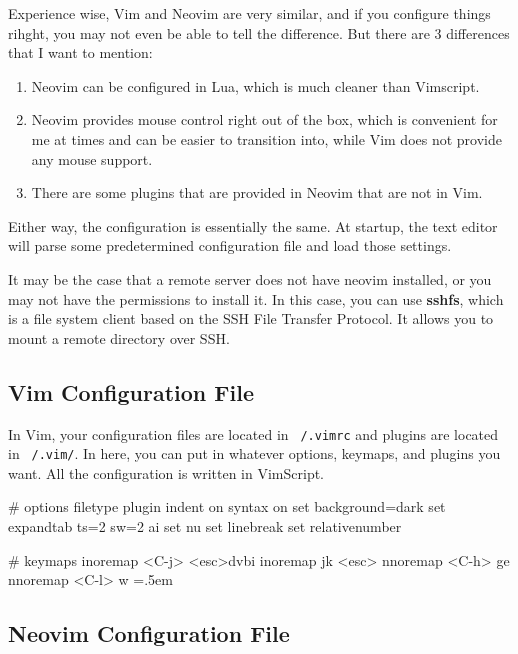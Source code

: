 \documentclass{article}
\newenvironment{cverbatim}
    {\SaveVerbatim{cverb}}
    {\endSaveVerbatim
    \flushleft\fboxrule=0pt\fboxsep=.5em
    \colorbox{cverbbg}{%
      \makebox[\dimexpr\linewidth-2\fboxsep][l]{\BUseVerbatim{cverb}}%
    }
    \endflushleft
  }
\begin{document}
    Experience wise, Vim and Neovim are very similar, and if you configure things rihght, you may not even be able to tell the difference. But there are 3 differences that I want to mention: 
    
    \begin{enumerate}
      \item Neovim can be configured in Lua, which is much cleaner than Vimscript. 
      \item Neovim provides mouse control right out of the box, which is convenient for me at times and can be easier to transition into, while Vim does not provide any mouse support. 
      \item There are some plugins that are provided in Neovim that are not in Vim. 
    \end{enumerate}

    Either way, the configuration is essentially the same. At startup, the text editor will parse some predetermined configuration file and load those settings. 

    It may be the case that a remote server does not have neovim installed, or you may not have the permissions to install it. In this case, you can use \textbf{sshfs}, which is a file system client based on the SSH File Transfer Protocol. It allows you to mount a remote directory over SSH. 

  \subsection{Vim Configuration File}

    In Vim, your configuration files are located in \texttt{~/.vimrc} and plugins are located in \texttt{~/.vim/}. In here, you can put in whatever options, keymaps, and plugins you want. All the configuration is written in VimScript. 

    \begin{cverbatim} 
      # options 
      filetype plugin indent on 
      syntax on 
      set background=dark
      set expandtab ts=2 sw=2 ai
      set nu
      set linebreak 
      set relativenumber        
      
      # keymaps
      inoremap <C-j> <esc>dvbi
      inoremap jk <esc>
      nnoremap <C-h> ge
      nnoremap <C-l> w 
    \end{cverbatim}
      
  \subsection{Neovim Configuration File}
\end{document}
